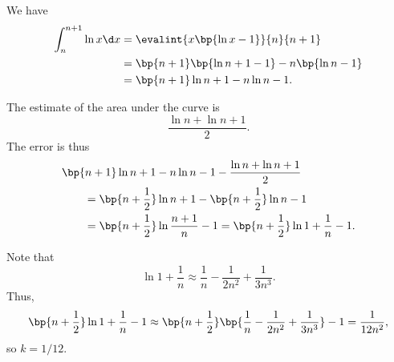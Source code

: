 \begin{solution}
    \begin{ppart}
        We have
        \begin{align*}
            \int_{n}^{n+1} \ln x \d x &= \evalint{x\bp{\ln x- 1}}{n}{n+1}\\
            &= \bp{n+1} \bp{\ln{n+1} - 1} - n \bp{\ln n - 1}\\
            &= \bp{n+1} \ln{n+1} - n \ln n - 1.
        \end{align*}
    \end{ppart}
    \begin{ppart}
        The estimate of the area under the curve is \[\frac{\ln n + \ln{n+1}}2.\] The error is thus
        \begin{align*}
            &\bp{n+1} \ln{n+1} - n \ln n - 1 - \frac{\ln n + \ln{n+1}}{2}\\
            &\hspace{2em}= \bp{n + \frac12} \ln{n+1} - \bp{n + \frac12} \ln n - 1\\
            &\hspace{2em}= \bp{n + \frac12} \ln{\frac{n+1}{n}} - 1 = \bp{n+\frac12} \ln{1 + \frac1n} - 1.
        \end{align*}
    \end{ppart}
    \begin{ppart}
        Note that \[\ln{1 + \frac1n} \approx \frac1n - \frac1{2n^2} + \frac1{3n^3}.\] Thus, \[\bp{n+\frac12} \ln{1 + \frac1n} - 1 \approx \bp{n + \frac12} \bp{\frac1n - \frac1{2n^2} + \frac1{3n^3}} - 1 = \frac1{12 n^2},\] so $k = 1/12$.
    \end{ppart}
\end{solution}
